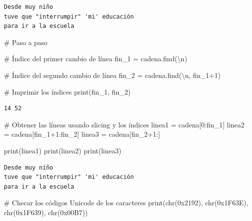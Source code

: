 \documentclass[
  spanish,
  letterpaper,
]{scrbook}
\newenvironment{Shaded}{\begin{snugshade}}{\end{snugshade}}
\newcommand{\BaseNTok}[1]{\textcolor[rgb]{0.68,0.00,0.00}{#1}}
\newcommand{\BuiltInTok}[1]{\textcolor[rgb]{0.00,0.23,0.31}{#1}}
\newcommand{\CharTok}[1]{\textcolor[rgb]{0.13,0.47,0.30}{#1}}
\newcommand{\CommentTok}[1]{\textcolor[rgb]{0.37,0.37,0.37}{#1}}
\newcommand{\DecValTok}[1]{\textcolor[rgb]{0.68,0.00,0.00}{#1}}
\newcommand{\NormalTok}[1]{\textcolor[rgb]{0.00,0.23,0.31}{#1}}
\newcommand{\OperatorTok}[1]{\textcolor[rgb]{0.37,0.37,0.37}{#1}}
\newcommand{\StringTok}[1]{\textcolor[rgb]{0.13,0.47,0.30}{#1}}
\theoremstyle{definition}
\theoremstyle{remark}
\begin{document}
\begin{verbatim}
Desde muy niño
tuve que "interrumpir" 'mi' educación
para ir a la escuela
\end{verbatim}

\begin{Shaded}
\begin{Highlighting}[]
\CommentTok{\# Paso a paso}

\CommentTok{\# Índice del primer cambio de línea}
\NormalTok{fin\_1 }\OperatorTok{=}\NormalTok{ cadena.find(}\StringTok{\textquotesingle{}}\CharTok{\textbackslash{}n}\StringTok{\textquotesingle{}}\NormalTok{)}

\CommentTok{\# Índice del segundo cambio de línea}
\NormalTok{fin\_2 }\OperatorTok{=}\NormalTok{ cadena.find(}\StringTok{\textquotesingle{}}\CharTok{\textbackslash{}n}\StringTok{\textquotesingle{}}\NormalTok{, fin\_1}\OperatorTok{+}\DecValTok{1}\NormalTok{)}

\CommentTok{\# Imprimir los índices}
\BuiltInTok{print}\NormalTok{(fin\_1, fin\_2)}
\end{Highlighting}
\end{Shaded}

\begin{verbatim}
14 52
\end{verbatim}

\begin{Shaded}
\begin{Highlighting}[]
\CommentTok{\# Obtener las líneas usando slicing y los índices}
\NormalTok{linea1 }\OperatorTok{=}\NormalTok{ cadena[}\DecValTok{0}\NormalTok{:fin\_1]}
\NormalTok{linea2 }\OperatorTok{=}\NormalTok{ cadena[fin\_1}\OperatorTok{+}\DecValTok{1}\NormalTok{:fin\_2]}
\NormalTok{linea3 }\OperatorTok{=}\NormalTok{ cadena[fin\_2}\OperatorTok{+}\DecValTok{1}\NormalTok{:]}

\BuiltInTok{print}\NormalTok{(linea1)}
\BuiltInTok{print}\NormalTok{(linea2)}
\BuiltInTok{print}\NormalTok{(linea3)}
\end{Highlighting}
\end{Shaded}

\begin{verbatim}
Desde muy niño
tuve que "interrumpir" 'mi' educación
para ir a la escuela
\end{verbatim}

\begin{Shaded}
\begin{Highlighting}[]
\CommentTok{\# Checar los códigos Unicode de los caracteres}
\BuiltInTok{print}\NormalTok{(}\BuiltInTok{chr}\NormalTok{(}\BaseNTok{0x2192}\NormalTok{), }\BuiltInTok{chr}\NormalTok{(}\BaseNTok{0x1F63E}\NormalTok{), }\BuiltInTok{chr}\NormalTok{(}\BaseNTok{0x1F639}\NormalTok{), }\BuiltInTok{chr}\NormalTok{(}\BaseNTok{0x00B7}\NormalTok{))}
\end{Highlighting}
\end{Shaded}
\end{document}
